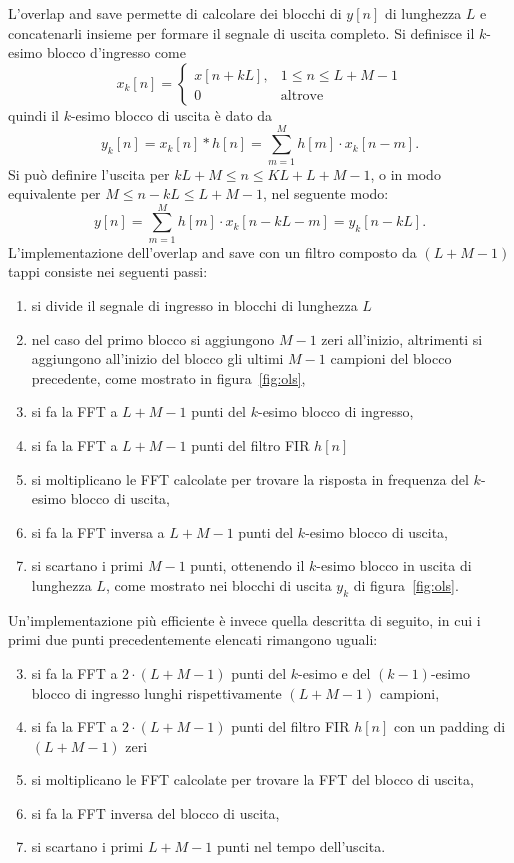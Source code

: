 \documentclass[12pt,a4paper,titlepage]{article}
\begin{document}
L'overlap and save permette di calcolare dei blocchi di $y[n]$ di lunghezza $L$ e concatenarli insieme per formare il segnale di uscita completo. Si definisce il $k$-esimo blocco d'ingresso come
\begin{equation}
x_k[n] = 
\begin{cases}
x[n+kL], & 1 \leq n \leq L + M - 1\\
0 & \text{altrove}
\end{cases}
\end{equation}
quindi il $k$-esimo blocco di uscita è dato da 
\begin{equation}
y_k[n] = x_k[n] * h[n] = \sum_{m=1}^{M} {h[m] \cdot x_k[n-m]}.
\end{equation}
Si può definire l'uscita per $kL + M \leq n \leq KL + L +M - 1$, o in modo equivalente per $M \leq n - kL \leq L + M - 1$, nel seguente modo:
\begin{equation}
y[n] = \sum_{m=1}^{M} {h[m] \cdot x_k[n-kL-m]} = y_k[n - kL].
\end{equation}
L'implementazione dell'overlap and save con un filtro composto da $(L + M - 1)$ tappi consiste nei seguenti passi:
\begin{enumerate}
\item si divide il segnale di ingresso in blocchi di lunghezza $L$
\item nel caso del primo blocco si aggiungono $M - 1$ zeri all'inizio, altrimenti si aggiungono all'inizio del blocco gli ultimi $M - 1$ campioni del blocco precedente, come mostrato in figura~\ref{fig:ols},
\item si fa la FFT a $L + M - 1$ punti del $k$-esimo blocco di ingresso,
\item si fa la FFT a $L + M - 1$ punti del filtro FIR $h[n]$
\item si moltiplicano le FFT calcolate per trovare la risposta in frequenza del $k$-esimo blocco di uscita,
\item si fa la FFT inversa a $L + M - 1$ punti del $k$-esimo blocco di uscita,
\item si scartano i primi $M - 1$ punti, ottenendo il $k$-esimo blocco in uscita di lunghezza $L$, come mostrato nei blocchi di uscita $y_k$ di figura~\ref{fig:ols}.
\end{enumerate}

Un'implementazione più efficiente è invece quella descritta di seguito, in cui i primi due punti precedentemente elencati rimangono uguali:
\begin{enumerate}\setcounter{enumi}{2}
\item si fa la FFT a $2 \cdot (L + M - 1)$ punti del $k$-esimo e del $(k-1)$-esimo blocco di ingresso lunghi rispettivamente $(L + M - 1)$ campioni,
\item si fa la FFT a $2 \cdot (L + M - 1)$ punti del filtro FIR $h[n]$ con un padding di $(L + M - 1)$ zeri
\item si moltiplicano le FFT calcolate per trovare la FFT del blocco di uscita,
\item si fa la FFT inversa del blocco di uscita,
\item si scartano i primi $L + M - 1$ punti nel tempo dell'uscita.
\end{enumerate}
\end{document}
